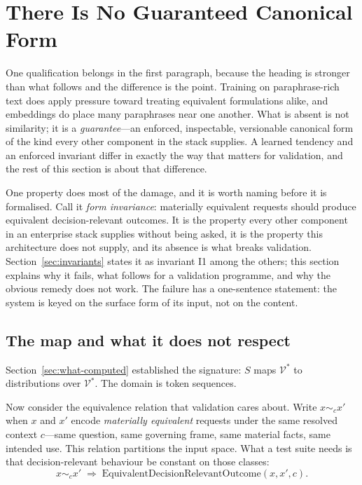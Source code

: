 \section{There Is No Guaranteed Canonical Form}
\label{sec:canonical-form}

One qualification belongs in the first paragraph, because the heading is stronger than
what follows and the difference is the point. Training on paraphrase-rich text does
apply pressure toward treating equivalent formulations alike, and embeddings do place
many paraphrases near one another. What is absent is not similarity; it is a
\emph{guarantee}---an enforced, inspectable, versionable canonical form of the kind
every other component in the stack supplies. A learned tendency and an enforced
invariant differ in exactly the way that matters for validation, and the rest of this
section is about that difference.

One property does most of the damage, and it is worth naming before it is formalised.
Call it \emph{form invariance}: materially equivalent requests should produce equivalent
decision-relevant outcomes. It is the property every other component in an enterprise
stack supplies without being asked, it is the property this architecture does not supply,
and its absence is what breaks validation. Section~\ref{sec:invariants} states it as
invariant I1 among the others; this section explains why it fails, what follows for a
validation programme, and why the obvious remedy does not work. The failure has a
one-sentence statement: the system is keyed on the surface form of its input, not on the
content.

\subsection{The map and what it does not respect}

Section~\ref{sec:what-computed} established the signature: $S$ maps
$\mathcal{V}^{*}$ to distributions over $\mathcal{V}^{*}$. The domain is token
sequences.

Now consider the equivalence relation that validation cares about. Write
$x \sim_c x'$ when $x$ and $x'$ encode \emph{materially equivalent} requests under
the same resolved context $c$---same question, same governing frame, same material
facts, same intended use. This relation partitions the input space. What a test
suite needs is that decision-relevant behaviour be constant on those classes:
\begin{equation}
  x \sim_c x' \;\Longrightarrow\; \text{EquivalentDecisionRelevantOutcome}(x, x', c).
  \label{eq:form-invariance}
\end{equation}

